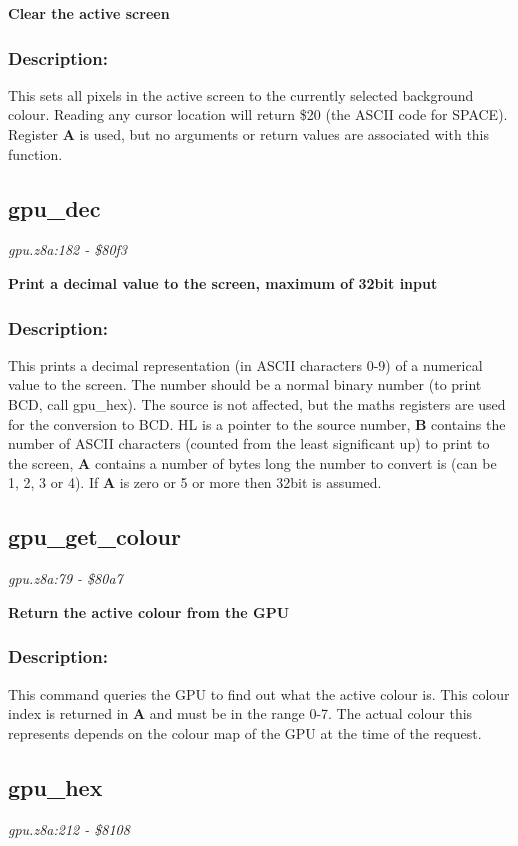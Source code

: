 \noindent
\textbf{Clear the active screen}

\subsubsection{Description:}
 This sets all pixels in the active screen to the currently selected background colour.  Reading any cursor location will return \$20 (the ASCII code for SPACE).  Register \textbf{A} is used, but no arguments or return values are associated with this function.

\subsection{gpu\_dec}
\textit{gpu.z8a:182 - \$80f3}

\noindent
\textbf{Print a decimal value to the screen, maximum of 32bit input}

\subsubsection{Description:}
 This prints a decimal representation (in ASCII characters 0-9) of a numerical value to the screen.  The number should be a normal binary number (to print BCD, call gpu\_hex).  The source is not affected, but the maths registers are used for the conversion to BCD.  HL is a pointer to the source number, \textbf{B} contains the number of ASCII characters (counted from the least significant up) to print to the screen, \textbf{A} contains a number of bytes long the number to convert is (can be 1, 2, 3 or 4).  If \textbf{A} is zero or 5 or more then 32bit is assumed.

\subsection{gpu\_get\_colour}
\textit{gpu.z8a:79 - \$80a7}

\noindent
\textbf{Return the active colour from the GPU}

\subsubsection{Description:}
 This command queries the GPU to find out what the active colour is.  This colour index is returned in \textbf{A} and must be in the range 0-7.  The actual colour this represents depends on the colour map of the GPU at the time of the request.

\subsection{gpu\_hex}
\textit{gpu.z8a:212 - \$8108}

